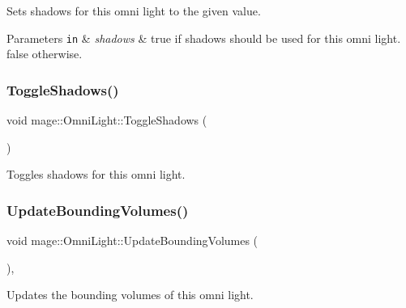Sets shadows for this omni light to the given value.


\begin{DoxyParams}[1]{Parameters}
\mbox{\tt in}  & {\em shadows} & {\ttfamily true} if shadows should be used for this omni light. {\ttfamily false} otherwise. \\
\hline
\end{DoxyParams}
\hypertarget{classmage_1_1_omni_light_a19164a13e884bce6fbc80b760c82d243}{}\label{classmage_1_1_omni_light_a19164a13e884bce6fbc80b760c82d243} 
\subsubsection{\texorpdfstring{Toggle\+Shadows()}{ToggleShadows()}}
{\footnotesize\ttfamily void mage\+::\+Omni\+Light\+::\+Toggle\+Shadows (\begin{DoxyParamCaption}{ }\end{DoxyParamCaption})\hspace{0.3cm}{\ttfamily [noexcept]}}

Toggles shadows for this omni light. \hypertarget{classmage_1_1_omni_light_a6a10cdc0ed276d68e5378eaf934158e1}{}\label{classmage_1_1_omni_light_a6a10cdc0ed276d68e5378eaf934158e1} 
\subsubsection{\texorpdfstring{Update\+Bounding\+Volumes()}{UpdateBoundingVolumes()}}
{\footnotesize\ttfamily void mage\+::\+Omni\+Light\+::\+Update\+Bounding\+Volumes (\begin{DoxyParamCaption}{ }\end{DoxyParamCaption})\hspace{0.3cm}{\ttfamily [private]}, {\ttfamily [noexcept]}}

Updates the bounding volumes of this omni light. \hypertarget{classmage_1_1_omni_light_a8d58e7e1b26e54b3d9785ca79213cc4f}{}\label{classmage_1_1_omni_light_a8d58e7e1b26e54b3d9785ca79213cc4f} 
